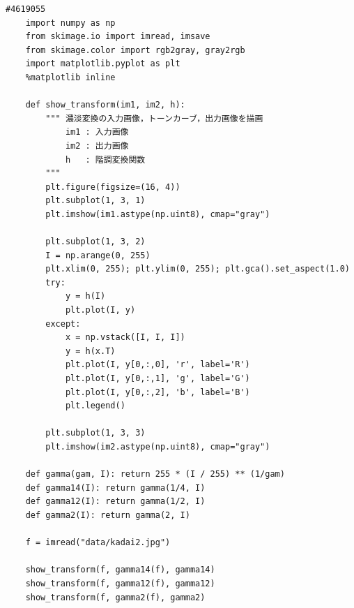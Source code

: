 \documentclass[12pt]{jarticle}
\begin{document}
\begin{lstlisting}[style = py,caption=kadai2]
    #4619055
    import numpy as np
    from skimage.io import imread, imsave
    from skimage.color import rgb2gray, gray2rgb
    import matplotlib.pyplot as plt
    %matplotlib inline
    
    def show_transform(im1, im2, h):
        """ 濃淡変換の入力画像，トーンカーブ，出力画像を描画
            im1 : 入力画像
            im2 : 出力画像
            h   : 階調変換関数
        """
        plt.figure(figsize=(16, 4))
        plt.subplot(1, 3, 1)
        plt.imshow(im1.astype(np.uint8), cmap="gray")
        
        plt.subplot(1, 3, 2)
        I = np.arange(0, 255)
        plt.xlim(0, 255); plt.ylim(0, 255); plt.gca().set_aspect(1.0)
        try:
            y = h(I)
            plt.plot(I, y)
        except:
            x = np.vstack([I, I, I])
            y = h(x.T)
            plt.plot(I, y[0,:,0], 'r', label='R')
            plt.plot(I, y[0,:,1], 'g', label='G')
            plt.plot(I, y[0,:,2], 'b', label='B')
            plt.legend()
       
        plt.subplot(1, 3, 3)
        plt.imshow(im2.astype(np.uint8), cmap="gray")
        
    def gamma(gam, I): return 255 * (I / 255) ** (1/gam)
    def gamma14(I): return gamma(1/4, I)
    def gamma12(I): return gamma(1/2, I)
    def gamma2(I): return gamma(2, I)
    
    f = imread("data/kadai2.jpg")
    
    show_transform(f, gamma14(f), gamma14)
    show_transform(f, gamma12(f), gamma12)
    show_transform(f, gamma2(f), gamma2)
\end{lstlisting}
\end{document}
